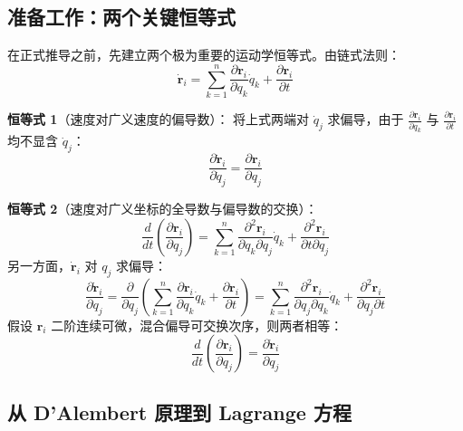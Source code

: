\subsection{准备工作：两个关键恒等式}

在正式推导之前，先建立两个极为重要的运动学恒等式。由链式法则：
\[
\dot{\mathbf{r}}_i = \sum_{k=1}^{n} \frac{\partial \mathbf{r}_i}{\partial q_k} \dot{q}_k + \frac{\partial \mathbf{r}_i}{\partial t}
\]

\textbf{恒等式 1}（速度对广义速度的偏导数）：
将上式两端对 $\dot{q}_j$ 求偏导，由于 $\frac{\partial \mathbf{r}_i}{\partial q_k}$ 与 $\frac{\partial \mathbf{r}_i}{\partial t}$ 均不显含 $\dot{q}_j$：
\[
\frac{\partial \dot{\mathbf{r}}_i}{\partial \dot{q}_j} = \frac{\partial \mathbf{r}_i}{\partial q_j}
\tag{1}
\]

\textbf{恒等式 2}（速度对广义坐标的全导数与偏导数的交换）：
\[
\frac{d}{dt} \left( \frac{\partial \mathbf{r}_i}{\partial q_j} \right) = \sum_{k=1}^{n} \frac{\partial^2 \mathbf{r}_i}{\partial q_k \partial q_j} \dot{q}_k + \frac{\partial^2 \mathbf{r}_i}{\partial t \partial q_j}
\]
另一方面，$\dot{\mathbf{r}}_i$ 对 $q_j$ 求偏导：
\[
\frac{\partial \dot{\mathbf{r}}_i}{\partial q_j} = \frac{\partial}{\partial q_j} \left( \sum_{k=1}^{n} \frac{\partial \mathbf{r}_i}{\partial q_k} \dot{q}_k + \frac{\partial \mathbf{r}_i}{\partial t} \right) = \sum_{k=1}^{n} \frac{\partial^2 \mathbf{r}_i}{\partial q_j \partial q_k} \dot{q}_k + \frac{\partial^2 \mathbf{r}_i}{\partial q_j \partial t}
\]
假设 $\mathbf{r}_i$ 二阶连续可微，混合偏导可交换次序，则两者相等：
\[
\frac{d}{dt} \left( \frac{\partial \mathbf{r}_i}{\partial q_j} \right) = \frac{\partial \dot{\mathbf{r}}_i}{\partial q_j}
\tag{2}
\]

\subsection{从 D'Alembert 原理到 Lagrange 方程}

